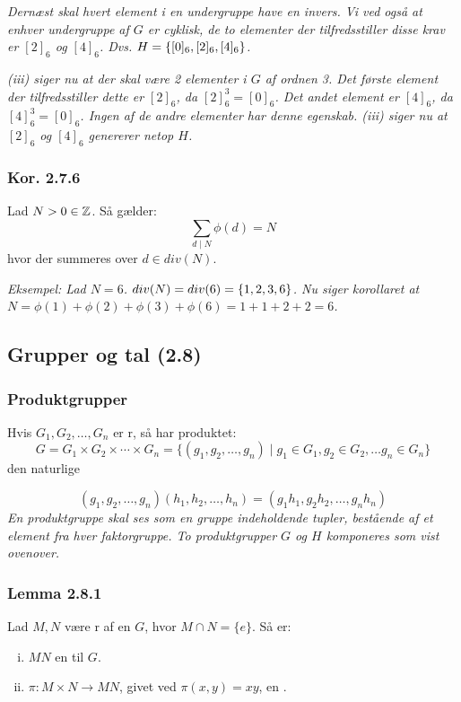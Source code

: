 \textit{Dernæst skal hvert element i en undergruppe have en invers. Vi ved også
at enhver undergruppe af $G$ er cyklisk, de to elementer der tilfredsstiller
disse krav er $[2]_6$ og $[4]_6$. Dvs. $H = \{ [0]_6,[2]_6,[4]_6 \}$.}

\textit{(iii) siger nu at der skal være 2 elementer i $G$ af ordnen 3. Det
første element der tilfredsstiller dette er $[2]_6$, da $[2]_{6}^3 = [0]_6$.
Det andet element er $[4]_6$, da $[4]_{6}^3 = [0]_6$. Ingen af de andre
elementer har denne egenskab.
(iii) siger nu at $[2]_6$ og $[4]_6$ genererer netop $H$.}

\subsubsection{Kor. 2.7.6}
Lad $N > 0 \in \mathbb{Z}$. Så gælder:
\begin{equation*}
  \sum_{d\mid N} \phi(d) = N
\end{equation*}
hvor der summeres over $d \in div(N)$.

\textit{Eksempel: Lad $N = 6$. $div(N) = div(6) = \{ 1,2,3,6 \}$. Nu siger
korollaret at $N = \phi(1) + \phi(2) + \phi(3) + \phi(6) = 1 + 1 + 2 + 2 = 6$.}


\subsection{Grupper og tal (2.8)}
\subsubsection{Produktgrupper}
Hvis $G_1, G_2,\ldots,G_n$ er r, så har produktet:
\begin{equation*}
  G = G_1 \times G_2 \times \cdots \times G_n = \{(g_1,g_2,\ldots,g_n) \mid g_1
  \in G_1, g_2 \in G_2,\ldots g_n \in G_n \}
\end{equation*}
den naturlige 

\begin{equation*}
  (g_1, g_2,\ldots,g_n)(h_1,h_2,\ldots,h_n) = (g_1 h_1,g_2 h_2, \ldots, g_n h_n)
\end{equation*}
\textit{En produktgruppe skal ses som en gruppe indeholdende tupler, bestående
af et element fra hver faktorgruppe. To produktgrupper $G$ og $H$ komponeres
som vist ovenover.}

\subsubsection{Lemma 2.8.1}
Lad $M, N$ være r af en  $G$, hvor
$M \cap N = \{e\}$. Så er: \begin{enumerate}[(i)]
  \item $MN$ en  til $G$.
  \item $\pi: M \times N \rightarrow MN$, givet ved $\pi(x,y) = xy$, en
  .
\end{enumerate}



